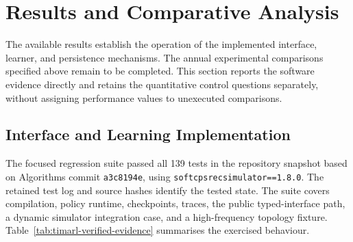\section{Results and Comparative Analysis}
\label{sec:timarl-results}

The available results establish the operation of the implemented interface, learner, and persistence mechanisms. The annual experimental comparisons specified above remain to be completed. This section reports the software evidence directly and retains the quantitative control questions separately, without assigning performance values to unexecuted comparisons.

\subsection{Interface and Learning Implementation}
\label{sec:timarl-results-nominal}

The focused regression suite passed all 139 tests in the repository snapshot based on Algorithms commit \texttt{a3c8194e}, using \texttt{softcpsrecsimulator==1.8.0}. The retained test log and source hashes identify the tested state. The suite covers compilation, policy runtime, checkpoints, traces, the public typed-interface path, a dynamic simulator integration case, and a high-frequency topology fixture. Table~\ref{tab:timarl-verified-evidence} summarises the exercised behaviour.

